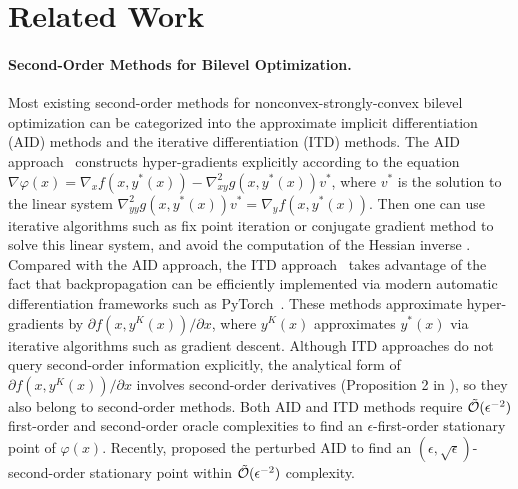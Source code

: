 \documentclass{article}
\begin{document}
\section{Related Work}


\paragraph{Second-Order Methods for Bilevel Optimization.
} 

Most existing second-order methods for nonconvex-strongly-convex bilevel optimization can be categorized into
the approximate implicit differentiation (AID) methods  and the iterative differentiation
(ITD) methods. The AID approach~\cite{liao2018reviving,ji2021bilevel,ghadimi2018approximation,lorraine2020optimizing} constructs hyper-gradients explicitly according to the equation $\nabla \varphi(x) = \nabla_x f(x,y^*(x)) - \nabla_{xy}^2 g(x,y^*(x)) v^*$, where $v^* $ is the solution to the linear system $\nabla_{yy}^2 g(x,y^*(x)) v^* =\nabla_y f(x,y^*(x)) $. Then one can use
iterative algorithms such as fix point iteration or conjugate gradient method to solve this linear system, and avoid the computation of the Hessian inverse \cite{grazzi2020iteration,ji2021bilevel,hong2023two}. 
Compared with the AID approach, the ITD approach~\cite{maclaurin2015gradient,shaban2019truncated,domke2012generic,franceschi2017forward,franceschi2018bilevel}  takes advantage of the fact that backpropagation can be efficiently implemented via modern
automatic differentiation frameworks such as PyTorch~\cite{paszke2019pytorch}. These methods approximate hyper-gradients by $\partial f(x,y^K(x)) / \partial x $, where $y^K(x)$  approximates $y^*(x)$ via iterative algorithms such as gradient descent. Although ITD approaches do not query second-order information explicitly, the analytical form of $\partial f(x,y^K(x)) / \partial x $ involves second-order derivatives (Proposition 2 in \cite{ji2021bilevel}), so they also belong to second-order methods. Both AID and ITD methods require $\tilde {{\mathcal{O}}}(\epsilon^{-2})$ first-order and second-order oracle complexities to find an $\epsilon$-first-order stationary point of $\varphi(x)$. Recently, \citet{huang2022efficiently} proposed the perturbed AID to find an $(\epsilon,\sqrt{\epsilon})$-second-order stationary point within $\tilde {{\mathcal{O}}}(\epsilon^{-2})$ complexity. 
\end{document}
